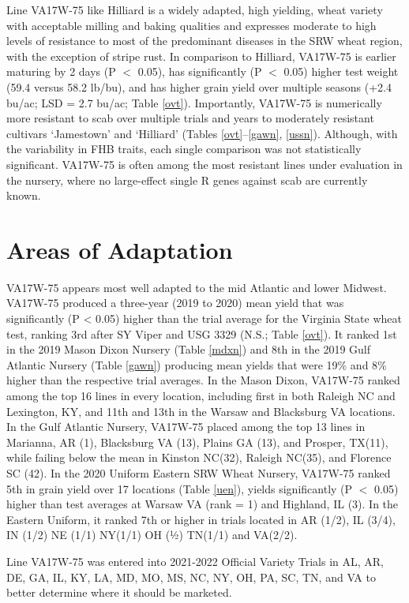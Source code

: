 \documentclass[12pt, letterpaper]{article}
\begin{document}
Line VA17W-75 like Hilliard is a widely adapted, high yielding, wheat variety with acceptable milling and baking qualities and expresses moderate to high levels of resistance to most of the predominant diseases in the SRW wheat region, with the exception of stripe rust.  In comparison to Hilliard, VA17W-75 is earlier maturing by 2 days (P $<$ 0.05), has significantly (P $<$ 0.05) higher test weight (59.4 versus 58.2 lb/bu), and has higher grain yield over multiple seasons (+2.4 bu/ac; LSD = 2.7 bu/ac; Table \ref{ovt}). Importantly, VA17W-75 is numerically more resistant to scab over multiple trials and years to moderately resistant cultivars `Jamestown' and `Hilliard' (Tables \ref{ovt}--\ref{gawn}, \ref{ussn}). Although, with the variability in FHB traits, each single comparison was not statistically significant. VA17W-75 is often among the most resistant lines under evaluation in the nursery, where no large-effect single R genes against scab are currently known. 

\section{Areas of Adaptation}
 
VA17W-75 appears most well adapted to the mid Atlantic and lower Midwest. VA17W-75 produced a three-year (2019 to 2020) mean yield that was significantly (P < 0.05) higher than the trial average for the Virginia State wheat test, ranking 3rd after SY Viper and USG 3329 (N.S.; Table \ref{ovt}).  It ranked 1st in the 2019 Mason Dixon Nursery (Table \ref{mdxn}) and 8th in the 2019 Gulf Atlantic Nursery (Table \ref{gawn}) producing mean yields that were 19\% and 8\% higher than the respective trial averages.  In the Mason Dixon, VA17W-75 ranked among the top 16 lines in every location, including first in both Raleigh NC and Lexington, KY, and 11th and 13th in the Warsaw and Blacksburg VA locations.  In the Gulf Atlantic Nursery, VA17W-75 placed among the top 13 lines in Marianna, AR (1), Blacksburg VA (13), Plains GA (13), and Prosper, TX(11), while failing below the mean in Kinston NC(32), Raleigh NC(35), and Florence SC (42). In the 2020 Uniform Eastern SRW Wheat Nursery, VA17W-75 ranked 5th in grain yield over 17 locations (Table \ref{uen}), yields significantly (P $<$ 0.05) higher than test averages at Warsaw VA (rank = 1) and Highland, IL (3). In the Eastern Uniform, it ranked 7th or higher in trials located in AR (1/2), IL (3/4), IN (1/2) NE (1/1) NY(1/1) OH (½) TN(1/1) and VA(2/2).

Line VA17W-75 was entered into 2021-2022 Official Variety Trials in AL, AR, DE, GA, IL, KY, LA, MD, MO, MS, NC, NY, OH, PA, SC, TN, and VA to better determine where it should be marketed. 
\end{document}
